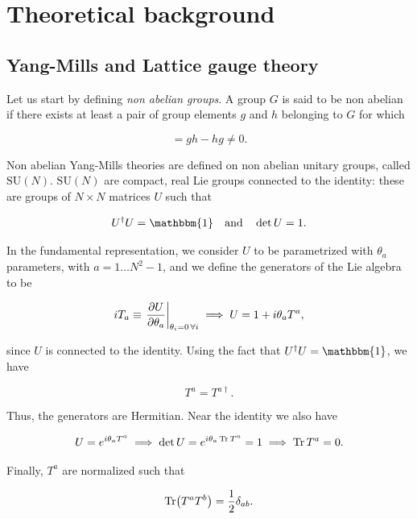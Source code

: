 \documentclass[reqno,12pt]{article}
\numberwithin{equation}{section}
\newcommand{\SU}{\mathrm{SU}}
\newcommand{\id}{\mathbbm{1}}
\begin{document}
\section{Theoretical background} \label{background}

\subsection{Yang-Mills and Lattice gauge theory} \label{lgt}

Let us start by defining \textit{non abelian groups}. A group $G$ is said to be non abelian if there exists at least
a pair of group elements $g$ and $h$ belonging to $G$ for which

\begin{equation}
	[g, h] = gh - hg \ne 0.
\end{equation}

Non abelian Yang-Mills theories are defined on non abelian unitary groups, called $\SU(N)$. 
$\SU(N)$ are compact, real Lie groups connected to the identity: these are groups of $N \times N$ matrices $U$
such that

\begin{equation}
	U^\dagger U = \id \qq{and} \det U = 1.
\end{equation}

In the fundamental representation, we consider $U$ to be parametrized with $\theta_a$ parameters, 
with $a = 1 \dots N^2 - 1$, and we define the generators of the Lie algebra to be

\begin{equation}
	iT_a \equiv \eval{\pdv{U}{\theta_a}}_{\theta_i = 0\,\forall i} \implies U = 1 + i \theta_aT^a,
\end{equation}

since $U$ is connected to the identity. Using the fact that $U^\dagger U = \id$, we have

\begin{equation}
	T^a = T^{a \dagger}.
\end{equation}

Thus, the generators are Hermitian. Near the identity we also have

\begin{equation}
	U = e^{i\theta_a T^a} \implies \det U = e^{i\theta_a \Tr T^a} = 1 \implies \Tr T^a = 0.
\end{equation}

Finally, $T^a$ are normalized such that

\begin{equation}
	\Tr(T^a T^b) = \frac{1}{2}\delta_{ab}.
\end{equation}
\end{document}

